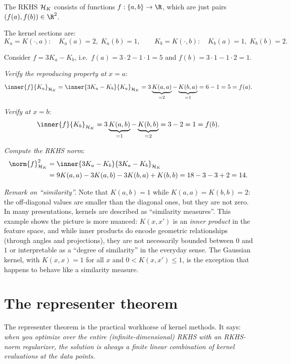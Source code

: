 \begin{notechapter}
\begin{example}
The RKHS $\mathcal{H}_K$ consists of functions $f: \{a,b\} \to \R$, which are just
pairs $(f(a), f(b)) \in \R^2$.

The kernel sections are:
\[
K_a = K(\cdot, a): \quad K_a(a) = 2,\; K_a(b) = 1, \qquad K_b = K(\cdot,
b): \quad K_b(a) = 1,\; K_b(b) = 2.
\]

Consider $f = 3K_a - K_b$, i.e.\ $f(a) = 3 \cdot 2 - 1 \cdot 1 = 5$ and
$f(b) = 3 \cdot 1 - 1 \cdot 2 = 1$.

\emph{Verify the reproducing property at $x = a$}:
\[
\inner{f}{K_a}_{\hk} = \inner{3K_a - K_b}{K_a}_{\hk} =
3\underbrace{K(a,a)}_{=2} - \underbrace{K(b,a)}_{=1} = 6 - 1 = 5 = f(a).
\]

\emph{Verify at $x = b$}:
\[
\inner{f}{K_b}_{\hk} = 3\underbrace{K(a,b)}_{=1} -
\underbrace{K(b,b)}_{=2} = 3 - 2 = 1 = f(b).
\]

\emph{Compute the RKHS norm}:
\[
\begin{aligned}
\norm{f}_{\hk}^2 &= \inner{3K_a - K_b}{3K_a - K_b}_{\hk}\\ &= 9K(a,a) -
3K(a,b) - 3K(b,a) + K(b,b) = 18 - 3 - 3 + 2 = 14.
\end{aligned}
\]

\emph{Remark on ``similarity''.}
Note that $K(a,b) = 1$ while $K(a,a) = K(b,b) = 2$:
the off-diagonal values are smaller than the diagonal
ones, but they are not zero. In many presentations,
kernels are described as ``similarity measures''.
This example shows the picture is more nuanced:
$K(x,x')$ is an \emph{inner product} in the feature
space, and while inner products do encode geometric
relationships (through angles and projections), they
are not necessarily bounded between $0$ and $1$ or
interpretable as a ``degree of similarity'' in the
everyday sense. The Gaussian kernel, with
$K(x,x) = 1$ for all $x$ and
$0 < K(x,x') \leq 1$, is the exception that
happens to behave like a similarity measure.
\end{example}


\section{The representer theorem}
\label{rkhs:sec:representer}

The representer theorem is the practical workhorse of kernel methods. It
says: \emph{when you optimize over the entire (infinite-dimensional)
RKHS with an RKHS-norm regularizer, the solution is always a finite
linear combination of kernel evaluations at the data points.}


\end{notechapter}
